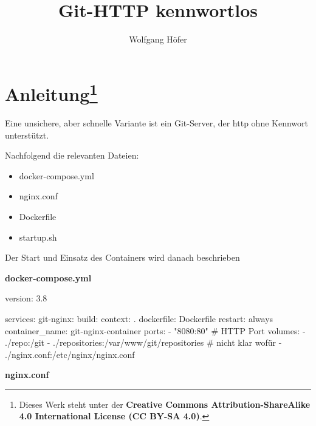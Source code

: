 \documentclass[
  ngerman,
  letterpaper,
  DIV=11]{scrreprt}
\title{Git-HTTP kennwortlos}
\author{Wolfgang Höfer}
\date{}
\newenvironment{Shaded}{\begin{snugshade}}{\end{snugshade}}
\newcommand{\CommentTok}[1]{\textcolor[rgb]{0.37,0.37,0.37}{#1}}
\newcommand{\ExtensionTok}[1]{\textcolor[rgb]{0.00,0.23,0.31}{#1}}
\newcommand{\NormalTok}[1]{\textcolor[rgb]{0.00,0.23,0.31}{#1}}
\newcommand{\StringTok}[1]{\textcolor[rgb]{0.13,0.47,0.30}{#1}}
\providecommand{\tightlist}{%
  \setlength{\itemsep}{0pt}\setlength{\parskip}{0pt}}
\begin{document}
\maketitle


\chapter[Anleitung]{\texorpdfstring{Anleitung\footnote{Dieses Werk steht
  unter der \textbf{Creative Commons Attribution-ShareAlike 4.0
  International License (CC BY-SA 4.0)}.}}{Anleitung}}\label{anleitungcc}

Eine unsichere, aber schnelle Variante ist ein Git-Server, der http ohne
Kennwort unterstützt.

Nachfolgend die relevanten Dateien:

\begin{itemize}
\tightlist
\item
  docker-compose.yml
\item
  nginx.conf
\item
  Dockerfile
\item
  startup.sh
\end{itemize}

Der Start und Einsatz des Containers wird danach beschrieben

\textbf{docker-compose.yml}

\begin{Shaded}
\begin{Highlighting}[]
\ExtensionTok{version:} \StringTok{\textquotesingle{}3.8\textquotesingle{}}

\ExtensionTok{services:}
  \ExtensionTok{git{-}nginx:}
    \ExtensionTok{build:}
      \ExtensionTok{context:}\NormalTok{ .}
      \ExtensionTok{dockerfile:}\NormalTok{ Dockerfile}
    \ExtensionTok{restart:}\NormalTok{ always}
    \ExtensionTok{container\_name:}\NormalTok{ git{-}nginx{-}container}
    \ExtensionTok{ports:}
      \ExtensionTok{{-}} \StringTok{"8080:80"}     \CommentTok{\# HTTP Port}
    \ExtensionTok{volumes:}
      \ExtensionTok{{-}}\NormalTok{ ./repo:/git}
      \ExtensionTok{{-}}\NormalTok{ ./repositories:/var/www/git/repositories }\CommentTok{\# nicht klar wofür}
      \ExtensionTok{{-}}\NormalTok{ ./nginx.conf:/etc/nginx/nginx.conf  }
\end{Highlighting}
\end{Shaded}

\textbf{nginx.conf}
\end{document}
